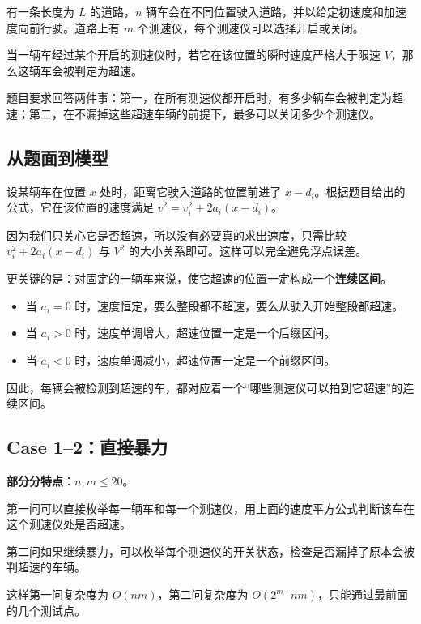 \documentclass{book}
\begin{document}
    有一条长度为 $L$ 的道路，$n$ 辆车会在不同位置驶入道路，并以给定初速度和加速度向前行驶。道路上有 $m$ 个测速仪，每个测速仪可以选择开启或关闭。

    当一辆车经过某个开启的测速仪时，若它在该位置的瞬时速度严格大于限速 $V$，那么这辆车会被判定为超速。

    题目要求回答两件事：第一，在所有测速仪都开启时，有多少辆车会被判定为超速；第二，在不漏掉这些超速车辆的前提下，最多可以关闭多少个测速仪。

    
    \subsection{从题面到模型}

    设某辆车在位置 $x$ 处时，距离它驶入道路的位置前进了 $x-d_i$。根据题目给出的公式，它在该位置的速度满足
    $v^2=v_i^2+2a_i(x-d_i)$。

    因为我们只关心它是否超速，所以没有必要真的求出速度，只需比较
    $v_i^2+2a_i(x-d_i)$ 与 $V^2$ 的大小关系即可。这样可以完全避免浮点误差。

    更关键的是：对固定的一辆车来说，使它超速的位置一定构成一个\textbf{连续区间}。

    \begin{itemize}[leftmargin=2em,itemsep=1pt,topsep=2pt,parsep=0pt,partopsep=0pt]
        \item 当 $a_i=0$ 时，速度恒定，要么整段都不超速，要么从驶入开始整段都超速。
        \item 当 $a_i>0$ 时，速度单调增大，超速位置一定是一个后缀区间。
        \item 当 $a_i<0$ 时，速度单调减小，超速位置一定是一个前缀区间。
    \end{itemize}

    因此，每辆会被检测到超速的车，都对应着一个“哪些测速仪可以拍到它超速”的连续区间。

    \subsection{Case 1--2：直接暴力}

    \textbf{部分分特点}：$n,m\le 20$。

    第一问可以直接枚举每一辆车和每一个测速仪，用上面的速度平方公式判断该车在这个测速仪处是否超速。

    第二问如果继续暴力，可以枚举每个测速仪的开关状态，检查是否漏掉了原本会被判超速的车辆。

    这样第一问复杂度为 $O(nm)$，第二问复杂度为 $O(2^m\cdot nm)$，只能通过最前面的几个测试点。
\end{document}

